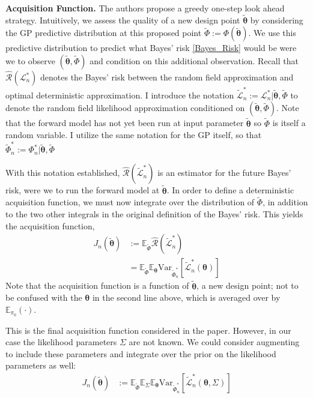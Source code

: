 \documentclass[12pt]{article}
\newcommand{\E}{\mathbb{E}}
\newcommand{\Var}{\mathrm{Var}}
\newcommand{\btheta}{\boldsymbol{\theta}}
\begin{document}
\bigskip
\noindent
\textbf{Acquisition Function.}
The authors propose a greedy one-step look ahead strategy. Intuitively, we assess the quality of a new design point $\tilde{\btheta}$ by considering the GP predictive distribution 
at this proposed point $\tilde{\Phi} := \Phi(\tilde{\btheta})$. We use this predictive distribution to predict what Bayes' risk \ref{Bayes_Risk} would be were we to observe 
$(\tilde{\btheta}, \tilde{\Phi})$ and condition on this additional observation. Recall that $\hat{\mathcal{R}}(\mathcal{L}_n^*)$ denotes the Bayes' risk between the 
random field approximation and optimal deterministic approximation. I introduce the notation $\tilde{\mathcal{L}}^*_n := \mathcal{L}^*_n|\tilde{\btheta}, \tilde{\Phi}$ to denote the 
random field likelihood approximation conditioned on $(\tilde{\btheta}, \tilde{\Phi})$. Note that the forward model has not yet been run at input parameter $\tilde{\btheta}$ so 
$\tilde{\Phi}$ is itself a random variable. I utilize the same notation for the GP itself, so that $\tilde{\Phi}^*_n := \Phi^*_n|\tilde{\btheta}, \tilde{\Phi}$

With this notation established, $\hat{\mathcal{R}}(\tilde{\mathcal{L}}^*_n)$ is an estimator for the future Bayes' risk, were we 
to run the forward model at $\tilde{\btheta}$. In order to define a deterministic acquisition function, we must now integrate over the distribution of $\tilde{\Phi}$, in addition to the two other 
integrals in the original definition of the Bayes' risk. This yields the acquisition function, 
\begin{align}
J_n(\tilde{\btheta}) &:=  \E_{\tilde{\Phi}} \hat{\mathcal{R}}(\tilde{\mathcal{L}}^*_n) \\ 
			     &= \E_{\tilde{\Phi}} \E_{\btheta} \Var_{\tilde{\Phi}_n^*}\left[\tilde{\mathcal{L}}_n^*(\btheta) \right]
\end{align}
Note that the acquisition function is a function of $\tilde{\btheta}$, a new design point; not to be confused with the $\btheta$ in the second line above, which is averaged over by 
$\E_{\pi_0}(\cdot)$. 

This is the final acquisition function considered in the paper. However, in our case the likelihood parameters $\Sigma$ are not known. We could consider augmenting to include these 
parameters and integrate over the prior on the likelihood parameters as well: 
\begin{align}
J_n(\tilde{\btheta}) &:= \E_{\tilde{\Phi}} \E_{\Sigma} \E_{\btheta} \Var_{\tilde{\Phi}_n^*}\left[\tilde{\mathcal{L}}_n^*(\btheta, \Sigma) \right]
\end{align}
\end{document}
